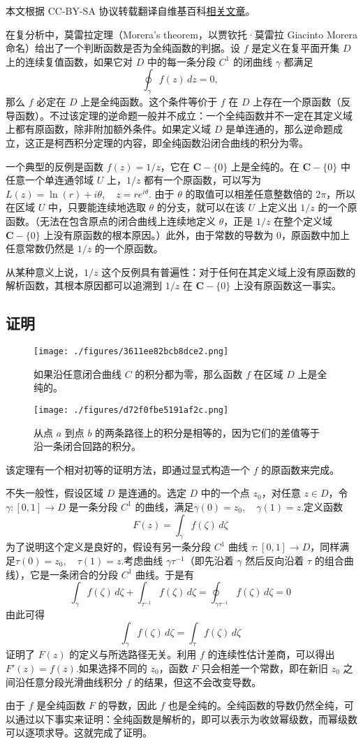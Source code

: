 
本文根据 CC-BY-SA 协议转载翻译自维基百科\href{https://en.wikipedia.org/wiki/Morera\%27s_theorem}{相关文章}。

在复分析中，莫雷拉定理（Morera's theorem，以贾钦托·莫雷拉 Giacinto Morera 命名）给出了一个判断函数是否为全纯函数的判据。设 $f$ 是定义在复平面开集 $D$ 上的连续复值函数，如果它对 $D$ 中的每一条分段 $C^1$ 的闭曲线 $\gamma$ 都满足
$$
\oint_{\gamma} f(z)\,dz = 0,~
$$
那么 $f$ 必定在 $D$ 上是全纯函数。这个条件等价于 $f$ 在 $D$ 上存在一个原函数（反导函数）。不过该定理的逆命题一般并不成立：一个全纯函数并不一定在其定义域上都有原函数，除非附加额外条件。如果定义域 $D$ 是单连通的，那么逆命题成立，这正是柯西积分定理的内容，即全纯函数沿闭合曲线的积分为零。

一个典型的反例是函数 $f(z) = 1/z$，它在 $\mathbf{C} - \{0\}$ 上是全纯的。在 $\mathbf{C} - \{0\}$ 中任意一个单连通邻域 $U$ 上，$1/z$ 都有一个原函数，可以写为$L(z) = \ln(r) + i\theta, \quad z = re^{i\theta}$.
由于 $\theta$ 的取值可以相差任意整数倍的 $2\pi$，所以在区域 $U$ 中，只要能连续地选取 $\theta$ 的分支，就可以在该 $U$ 上定义出 $1/z$ 的一个原函数。（无法在包含原点的闭合曲线上连续地定义 $\theta$，正是 $1/z$ 在整个定义域 $\mathbf{C} - \{0\}$ 上没有原函数的根本原因。）此外，由于常数的导数为 0，原函数中加上任意常数仍然是 $1/z$ 的一个原函数。

从某种意义上说，$1/z$ 这个反例具有普遍性：对于任何在其定义域上没有原函数的解析函数，其根本原因都可以追溯到 $1/z$ 在 $\mathbf{C} - \{0\}$ 上没有原函数这一事实。
\subsection{证明}
\begin{figure}[ht]
\centering
\texttt{[image: ./figures/3611ee82bcb8dce2.png]}
\caption{如果沿任意闭合曲线 $C$ 的积分都为零，那么函数 $f$ 在区域 $D$ 上是全纯的。} \label{fig_MLLdl_1}
\end{figure}
\begin{figure}[ht]
\centering
\texttt{[image: ./figures/d72f0fbe5191af2c.png]}
\caption{从点 $a$ 到点 $b$ 的两条路径上的积分是相等的，因为它们的差值等于沿一条闭合回路的积分。} \label{fig_MLLdl_2}
\end{figure}
该定理有一个相对初等的证明方法，即通过显式构造一个 $f$ 的原函数来完成。

不失一般性，假设区域 $D$ 是连通的。选定 $D$ 中的一个点 $z_0$，对任意 $z \in D$，令 $\gamma: [0,1] \to D$ 是一条分段 $C^1$ 的曲线，满足$\gamma(0) = z_0, \quad \gamma(1) = z$.定义函数
$$
F(z) = \int_{\gamma} f(\zeta)\,d\zeta~
$$
为了说明这个定义是良好的，假设有另一条分段 $C^1$ 曲线 $\tau: [0,1] \to D$，同样满足$\tau(0) = z_0, \quad \tau(1) = z$.考虑曲线 $\gamma \tau^{-1}$（即先沿着 $\gamma$ 然后反向沿着 $\tau$ 的组合曲线），它是一条闭合的分段 $C^1$ 曲线。于是有
$$
\int_{\gamma} f(\zeta)\,d\zeta + \int_{\tau^{-1}} f(\zeta)\,d\zeta
= \oint_{\gamma \tau^{-1}} f(\zeta)\,d\zeta
= 0~
$$
由此可得
$$
\int_{\gamma} f(\zeta)\,d\zeta = \int_{\tau} f(\zeta)\,d\zeta~
$$
证明了 $F(z)$ 的定义与所选路径无关。利用 $f$ 的连续性估计差商，可以得出$
F'(z) = f(z)$.如果选择不同的 $z_0$，函数 $F$ 只会相差一个常数，即在新旧 $z_0$ 之间沿任意分段光滑曲线积分 $f$ 的结果，但这不会改变导数。

由于 $f$ 是全纯函数 $F$ 的导数，因此 $f$ 也是全纯的。全纯函数的导数仍然全纯，可以通过以下事实来证明：全纯函数是解析的，即可以表示为收敛幂级数，而幂级数可以逐项求导。这就完成了证明。
